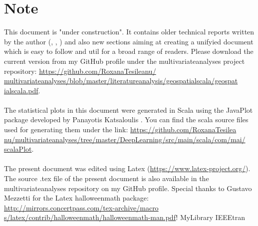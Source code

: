 \documentclass {article}
\begin{document}
\section* {Note}
This document is "under construction". It contains older technical reports written by the author (\cite{tesileanu_using_2017}, \cite{tesileanu_introduction_2017}, \cite{tesileanu_geostatistics_2017}) and also new sections aiming at creating a unifyied document which is easy to follow and util for a broad range of readers.  
Please download the current version from  my GitHub profile under the multivariate\underline{\space}analyses project repository: \href{https://github.com/RoxanaTesileanu/multivariate_analyses/blob/master/literature_analysis/geospatial_scala/geospatial_scala.pdf}{https://github.com/RoxanaTesileanu/\\multivariate\underline{\space}analyses/blob/master/literature\underline{\space}analysis/geospatial\underline{\space}scala/geospat\\ial\underline{\space}scala.pdf}. 
\\
\\
The statistical plots in this document were generated in Scala using the JavaPlot package developed by Panayotis Katsaloulis \cite{panayotis_javaplot_2017}. You can find the scala source files used for generating them under the link: 
\href{https://github.com/RoxanaTesileanu/multivariate_analyses/tree/master/DeepLearning/src/main/scala/com/mai/scalaPlot}{https://github.com/RoxanaTesilea\\nu/multivariate\underline{\space}analyses/tree/master/DeepLearning/src/main/scala/com/mai/\\scalaPlot}.  
\\
\\
The present document was edited using Latex \cite{claudio_latex-tutorial.com_nodate} (\href{https://www.latex-project.org/}{https://www.latex-project.org/}). The source .tex file of the present document is also available in the multivariate\underline{\space}analyses repository on my GitHub profile. Special thanks to Gustavo Mezzetti for the Latex halloweenmath package:
\href{http://mirrors.concertpass.com/tex-archive/macros/latex/contrib/halloweenmath/halloweenmath-man.pdf}{http://mirrors.concertpass.com/tex-archive/macro\\s/latex/contrib/halloweenmath/halloweenmath-man.pdf}!  
 {MyLibrary}
 {IEEEtran}
\end{document}
